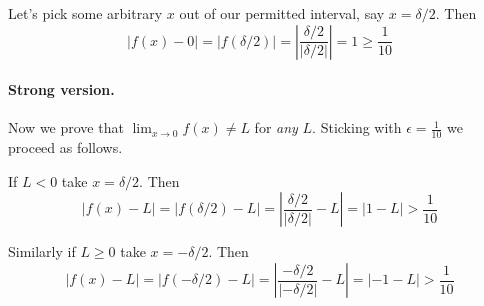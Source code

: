 \vs

Let's pick some arbitrary $x$ out of our permitted interval, say $x=\delta/2$. Then
\[|f(x)-0|=|f(\delta/2)|=\left|\frac{\delta/2}{|\delta/2|}\right|=1\geq\frac{1}{10}\]


\paragraph{Strong version.}

Now we prove that $\lim_{x\to 0}f(x)\neq L$ for \textit{any} $L$. Sticking with $\epsilon=\frac{1}{10}$ we proceed as follows.

\vs

If $L<0$ take $x=\delta/2$. Then
\[|f(x)-L|=|f(\delta/2)-L|=\left|\frac{\delta/2}{|\delta/2|}-L\right|=|1-L|>\frac{1}{10}\]

Similarly if $L\geq 0$ take $x=-\delta/2$. Then
\[|f(x)-L|=|f(-\delta/2)-L|=\left|\frac{-\delta/2}{|-\delta/2|}-L\right|=|-1-L|>\frac{1}{10}\]

